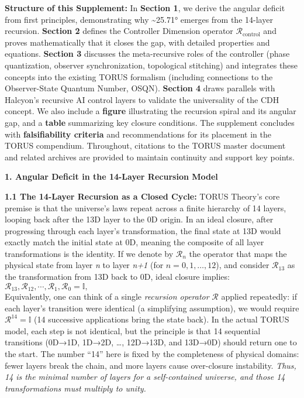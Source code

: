 \documentclass[]{article}
\begin{document}
\textbf{Structure of this Supplement:} In \textbf{Section 1}, we derive
the angular deficit from first principles, demonstrating why
\textasciitilde{}25.71° emerges from the 14-layer recursion.
\textbf{Section 2} defines the Controller Dimension operator
$\mathcal{R}_{\text{control}}$
and proves mathematically that it closes the gap, with detailed
properties and equations. \textbf{Section 3} discusses the
meta-recursive roles of the controller (phase quantization, observer
synchronization, topological stitching) and integrates these concepts
into the existing TORUS formalism (including connections to the
Observer-State Quantum Number, OSQN). \textbf{Section 4} draws parallels
with Halcyon's recursive AI control layers to validate the universality
of the CDH concept. We also include a \textbf{figure} illustrating the
recursion spiral and its angular gap, and a \textbf{table} summarizing
key closure conditions. The supplement concludes with
\textbf{falsifiability criteria} and recommendations for its placement
in the TORUS compendium. Throughout, citations to the TORUS master
document and related archives are provided to maintain continuity and
support key points.

\textbf{1. Angular Deficit in the 14-Layer Recursion Model}

\textbf{1.1 The 14-Layer Recursion as a Closed Cycle:} TORUS Theory's
core premise is that the universe's laws repeat across a finite
hierarchy of 14 layers, looping back after the 13D layer to the 0D
origin​. In an ideal closure, after progressing through each layer's
transformation, the final state at 13D would exactly match the initial
state at 0D, meaning the composite of all layer transformations is the
identity. If we denote by $\mathcal{R}_n$ the
operator that maps the physical state from layer \emph{n} to layer
\emph{n+1} (for
$n=0,1,\ldots,12$), and
consider $\mathcal{R}_{13}$ as the
transformation from 13D back to 0D, ideal closure implies:\\
$\mathcal{R}_{13},\mathcal{R}_{12},\cdots,\mathcal{R}_1,\mathcal{R}_0
= \mathbb{I}, \tag{1}$\\
Equivalently, one can think of a single \emph{recursion operator}
$\mathcal{R}$ applied repeatedly: if each layer's
transition were identical (a simplifying assumption), we would require
$\mathcal{R}^{14}=\mathbb{I}$ (14 successive applications bring the
state back)​. In the actual TORUS model, each step is not identical, but
the principle is that 14 sequential transitions (0D→1D, 1D→2D, \ldots{},
12D→13D, and 13D→0D) should return one to the start. The number ``14''
here is fixed by the completeness of physical domains: fewer layers
break the chain, and more layers cause over-closure instability​.
\emph{Thus, 14 is the minimal number of layers for a self-contained
universe, and those 14 transformations must multiply to unity.}
\end{document}
